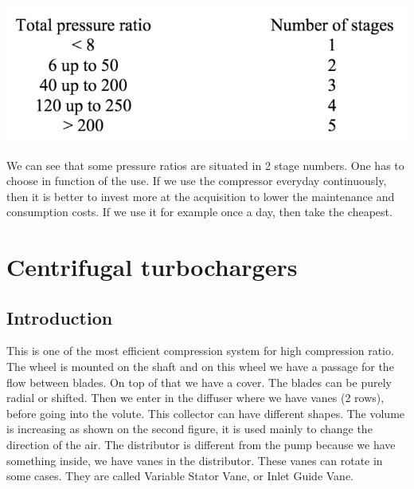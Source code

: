 \begin{center}
\includegraphics[scale=0.8]{ch5/22}
\end{center}

We can see that some pressure ratios are situated in 2 stage numbers. One has to choose in function of the use. If we use the compressor everyday continuously, then it is better to invest more at the acquisition to lower the maintenance and consumption costs. If we use it for example once a day, then take the cheapest. 

\section{Centrifugal turbochargers}
\subsection{Introduction}

This is one of the most efficient compression system for high compression ratio. The wheel is mounted on the shaft and on this wheel we have a passage for the flow between blades. On top of that we have a cover. The blades can be purely radial or shifted. Then we enter in the diffuser where we have vanes (2 rows), before going into the volute. This collector can have different shapes. The volume is increasing as shown on the second figure, it is used mainly to change the direction of the air. The distributor is different from the pump because we have something inside, we have vanes in the distributor. These vanes can rotate in some cases. They are called Variable Stator Vane, or Inlet Guide Vane.
